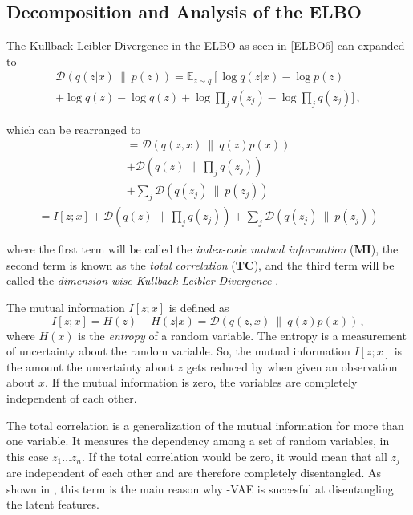 \documentclass[a4paper]{IEEEtran}
\begin{document}
\subsection{Decomposition and Analysis of the ELBO}
The Kullback-Leibler Divergence in the ELBO as seen in \eqref{ELBO6} can expanded to
\begin{align*}
\mathcal{D}(q(z|x) \ \| \ p(z)) =
	\mathbb{E}_{z \sim q} \left[ \log q(z|x) - \log p(z) \right. \\
	 + \log q(z) - \log q(z) + \log \prod_j q(z_j) - \log \prod_j q(z_j) ]\,,
\end{align*}

which can be rearranged to 
\begin{align*}
	= \mathcal{D}(q(z, x) \ \| \ q(z)p(x)) \\ + \mathcal{D}(q(z) \ \| \  \prod_{j} q(z_j)) \\ + \sum_j \mathcal{D}(q(z_j) \ \| \ p(z_j))
\end{align*}
\begin{align*}
	= I[z;x] + \mathcal{D}(q(z) \ \| \  \prod_{j} q(z_j)) + \sum_j \mathcal{D}(q(z_j) \ \| \ p(z_j))
\end{align*}

where the first term will be called the \textit{index-code mutual information} (\textbf{MI}), the second term is known as the \textit{total correlation} (\textbf{TC}), and the third term will be called the \textit{dimension wise Kullback-Leibler Divergence} \cite{chen2019isolating}.

The mutual information $I\left[ z; x \right]$ is defined as
\begin{equation}
	I[z;x] = H(z) - H(z|x) = \mathcal{D}(q(z, x) \ \| \ q(z)p(x))\,,
\end{equation}
where $H(x)$ is the \textit{entropy} of a random variable. The entropy is a measurement of uncertainty about the random variable. So, the mutual information $I[z;x]$ is the amount the uncertainty about $z$ gets reduced by when given an observation about $x$. If the mutual information is zero, the variables are completely independent of each other.

The total correlation is a generalization of the mutual information for more than one variable. It measures the dependency among a set of random variables, in this case $z_1 \ldots z_n$. If the total correlation would be zero, it would mean that all $z_j$ are independent of each other and are therefore completely disentangled. As shown in \cite{chen2019isolating}, this term is the main reason why \textbeta -VAE is succesful at disentangling the latent features.
\end{document}
